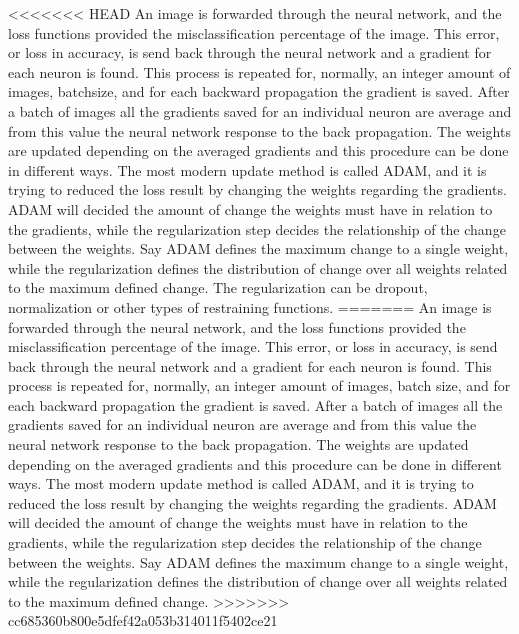<<<<<<< HEAD
An image is forwarded through the neural network, and the loss functions provided the misclassification percentage of the image. This error, or loss in accuracy, is send back through the neural network and a gradient for each neuron is found. This process is repeated for, normally, an integer amount of images, batchsize, and for each backward propagation the gradient is saved. After a batch of images all the gradients saved for an individual neuron are average and from this value the neural network response to the back propagation. The weights are updated depending on the averaged gradients and this procedure can be done in different ways. The most modern update method is called ADAM, and it is trying to reduced the loss result by changing the weights regarding the gradients. ADAM will decided the amount of change the weights must have in relation to the gradients, while the regularization step decides the relationship of the change between the weights. Say ADAM defines the maximum change to a single weight, while the regularization defines the distribution of change over all weights related to the maximum defined change. The regularization can be dropout, normalization or other types of restraining functions. 
=======
An image is forwarded through the neural network, and the loss functions provided the misclassification percentage of the image. This error, or loss in accuracy, is send back through the neural network and a gradient for each neuron is found. This process is repeated for, normally, an integer amount of images, batch size, and for each backward propagation the gradient is saved. After a batch of images all the gradients saved for an individual neuron are average and from this value the neural network response to the back propagation. The weights are updated depending on the averaged gradients and this procedure can be done in different ways. The most modern update method is called ADAM, and it is trying to reduced the loss result by changing the weights regarding the gradients. ADAM will decided the amount of change the weights must have in relation to the gradients, while the regularization step decides the relationship of the change between the weights. Say ADAM defines the maximum change to a single weight, while the regularization defines the distribution of change over all weights related to the maximum defined change.
>>>>>>> cc685360b800e5dfef42a053b314011f5402ce21

\FloatBarrier


